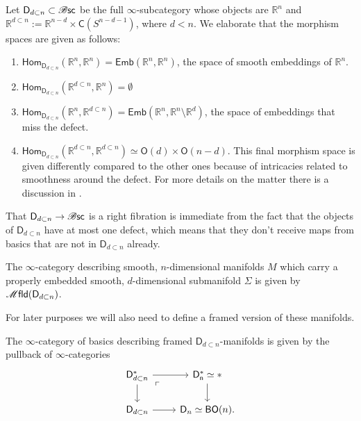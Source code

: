 \documentclass[../text]{subfiles}
\begin{document}
\begin{construction}
    Let $\mathsf{D}_{d \subset n} \subset \mathscr{B} \mathsf{sc}$ be the full $\infty$-subcategory whose objects are $\mathbb{R}^n$ and $\mathbb{R}^{d \subset n} := \mathbb{R}^{n-d} \times \mathsf{C}(S^{n-d-1})$, where $d < n$. We elaborate that the morphism spaces are given as follows:
    \begin{enumerate}
        \item $\mathsf{Hom}_{\mathsf{D}_{d \subset n}} (\mathbb{R}^n, \mathbb{R}^n) = \mathsf{Emb}(\mathbb{R}^n, \mathbb{R}^n)$, the space of smooth embeddings of $\mathbb{R}^n$.
        \item $\mathsf{Hom}_{\mathsf{D}_{d \subset n}} (\mathbb{R}^{d \subset n}, \mathbb{R}^n) = \emptyset$
        \item $\mathsf{Hom}_{\mathsf{D}_{d \subset n}} (\mathbb{R}^n, \mathbb{R}^{d \subset n}) = \mathsf{Emb}(\mathbb{R}^n, \mathbb{R}^n \setminus \mathbb{R}^d)$, the space of embeddings that miss the defect.
        \item $\mathsf{Hom}_{\mathsf{D}_{d \subset n}} (\mathbb{R}^{d \subset n}, \mathbb{R}^{d \subset n}) \simeq \mathsf{O}(d) \times \mathsf{O}(n-d)$. This final morphism space is given differently compared to the other ones because of intricacies related to smoothness around the defect. For more details on the matter there is a discussion in \cite[ex.5.1.7]{aft_localstrut}.
    \end{enumerate}
    That $\mathsf{D}_{d \subset n} \rightarrow \mathscr{B} \mathsf{sc}$ is a right fibration is immediate from the fact that the objects of $\mathsf{D}_{d \subset n}$ have at most one defect, which means that they don't receive maps from basics that are not in $\mathsf{D}_{d \subset n}$ already.
\end{construction}

\begin{definition}\label{def:mfld_disk_dn}
    The $\infty$-category describing smooth, $n$-dimensional manifolds $M$ which carry a properly embedded smooth, $d$-dimensional submanifold $\Sigma$ is given by $\mfld(\mathsf{D}_{d \subset n})$.
\end{definition}

For later purposes we will also need to define a framed version of these manifolds.

\begin{definition}\label{def:framed_d_under_n_structure}
    The $\infty$-category of basics describing framed $\mathsf{D}_{d \subset n}$-manifolds is given by the pullback of $\infty$-categories
    \begin{equation}
        \begin{tikzcd}
            \mathsf{D}_{d \subset n}^* \arrow[dr, phantom, "\ulcorner", very near start] \arrow[r] \arrow[d] & \mathsf{D_n^*} \simeq * \arrow[d] \\
            \mathsf{D}_{d \subset n} \arrow[r] & \mathsf{D}_n \simeq \mathsf{BO}(n).
        \end{tikzcd}
    \end{equation}
\end{definition}
\end{document}
